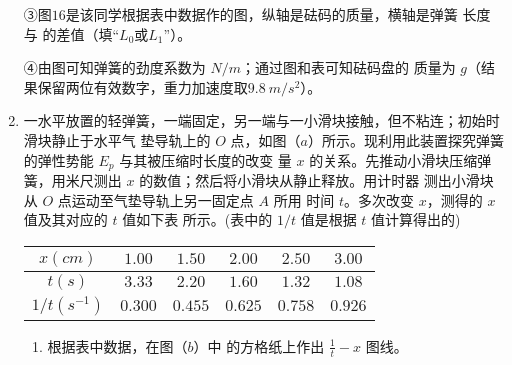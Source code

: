 \begin{enumerate}
③图$ 16 $是该同学根据表中数据作的图，纵轴是砝码的质量，横轴是弹簧
长度与  的差值（填“$ L_{0} $或$ L_{1} $”）。
\begin{figure}[h!]
\centering

\end{figure}

④由图可知弹簧的劲度系数为  $ N/m $；通过图和表可知砝码盘的
质量为  $ g $（结果保留两位有效数字，重力加速度取$ 9.8 \ m/s^{2} $）。



\newpage
\item 
{}
一水平放置的轻弹簧，一端固定，另一端与一小滑块接触，但不粘连；初始时滑块静止于水平气
垫导轨上的 $ O $ 点，如图（$ a $）所示。现利用此装置探究弹簧的弹性势能 $ E_{p} $ 与其被压缩时长度的改变
量 $ x $ 的关系。先推动小滑块压缩弹簧，用米尺测出 $ x $ 的数值；然后将小滑块从静止释放。用计时器
测出小滑块从 $ O $ 点运动至气垫导轨上另一固定点 $ A $ 所用
时间 $ t $。多次改变 $ x $，测得的 $ x $ 值及其对应的 $ t $ 值如下表
所示。(表中的 $ 1/t $ 值是根据 $ t $ 值计算得出的)
\begin{figure}[h!]
\centering

\end{figure}


\begin{table}[h!]
\centering 
\begin{tabular}{|c|c|c|c|c|c|}
\hline 
$ x(cm) $ & $ 1.00 $ & $ 1.50 $ & $ 2.00 $ & $ 2.50 $ & $ 3.00 $
 \\
\hline
$ t(s) $ & $ 3.33 $ & $ 2.20 $ & $ 1.60 $ & $ 1.32 $ & $ 1.08 $
 \\
\hline
$ 1/t(s^{-1}) $ & $ 0.300 $ & $ 0.455 $ & $ 0.625 $ & $ 0.758 $ & $ 0.926 $\\ 
\hline 
\end{tabular}
\end{table} 



\begin{enumerate}
\renewcommand{\labelenumi}{\arabic{enumi}.}
\item
根据表中数据，在图（$ b $）中
的方格纸上作出 $ \frac{1}{t}-x $ 图线。
\begin{figure}[h!]
\centering

\end{figure}


\end{enumerate}
\end{enumerate}
